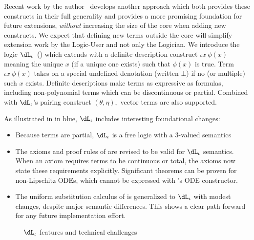 \documentclass[12pt]{cmuthesis}
\theoremstyle{definition}
\theoremstyle{remark}
\newcommand{\meps}[2]{\iota{#1}~{#2}}
\newcommand{\rref}[2][]{\prettyref{#2}}
\newcommand{\dLi}{\ensuremath{\dL_\iota}\xspace}
\begin{document}
Recent work by the author~\cite{DBLP:conf/cade/BohrerFP19} develops another approach which both provides these constructs in their full generality and provides a more promising foundation for future extensions, \emph{without} increasing the size of the core when adding new constructs.
We expect that defining new terms outside the core will simplify extension work by the Logic-User and not only the Logician.
We introduce the logic \dLi~(\rref{fig:dli-overview}) which extends \dL with a definite description construct $\meps{x}{\phi(x)}$ meaning the unique $x$ (if a unique one exists) such that $\phi(x)$ is true.
Term $\meps{x}{\phi(x)}$ takes on a special undefined denotation (written $\bot$) if no (or multiple) such $x$ exists.
Definite descriptions make terms as expressive as formulas, including non-polynomial terms which can be discontinuous or partial.
Combined with $\dLi$'s pairing construct $(\theta,\eta),$ vector terms are also supported.

As illustrated in \rref{fig:dli-overview} in blue, \dLi includes interesting foundational changes:
\begin{itemize}
\item Because terms are partial, \dLi is a free logic with a 3-valued semantics
\item The axioms and proof rules of \dL are revised to be valid for \dLi semantics.
When an axiom requires terms to be continuous or total, the axioms now state these requirements explicitly.
Significant theorems can be proven for non-Lipschitz ODEs, which cannot be expressed with \dL's ODE constructor.
\item The uniform substitution calculus of \dL is generalized to \dLi with modest changes, despite major semantic differences.
This shows a clear path forward for any future implementation effort.
\end{itemize}

\begin{figure}
\centering
\caption{\dLi features and technical challenges}
\label{fig:dli-overview}
\end{figure}
\end{document}
